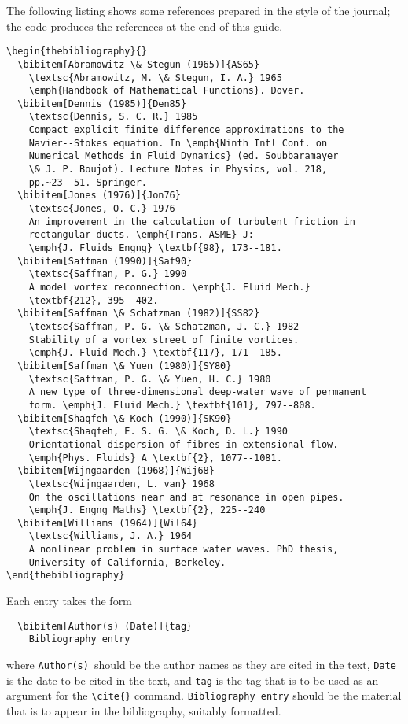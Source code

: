 \documentclass{jfm}
\begin{document}
The following listing shows some references prepared in the style of the
journal; the code produces the references at the end of this guide.
%
\begin{verbatim}
\begin{thebibliography}{}
  \bibitem[Abramowitz \& Stegun (1965)]{AS65}
    \textsc{Abramowitz, M. \& Stegun, I. A.} 1965
    \emph{Handbook of Mathematical Functions}. Dover.
  \bibitem[Dennis (1985)]{Den85}
    \textsc{Dennis, S. C. R.} 1985
    Compact explicit finite difference approximations to the
    Navier--Stokes equation. In \emph{Ninth Intl Conf. on
    Numerical Methods in Fluid Dynamics} (ed. Soubbaramayer
    \& J. P. Boujot). Lecture Notes in Physics, vol. 218,
    pp.~23--51. Springer.
  \bibitem[Jones (1976)]{Jon76}
    \textsc{Jones, O. C.} 1976
    An improvement in the calculation of turbulent friction in
    rectangular ducts. \emph{Trans. ASME} J:
    \emph{J. Fluids Engng} \textbf{98}, 173--181.
  \bibitem[Saffman (1990)]{Saf90}
    \textsc{Saffman, P. G.} 1990
    A model vortex reconnection. \emph{J. Fluid Mech.}
    \textbf{212}, 395--402.
  \bibitem[Saffman \& Schatzman (1982)]{SS82}
    \textsc{Saffman, P. G. \& Schatzman, J. C.} 1982
    Stability of a vortex street of finite vortices.
    \emph{J. Fluid Mech.} \textbf{117}, 171--185.
  \bibitem[Saffman \& Yuen (1980)]{SY80}
    \textsc{Saffman, P. G. \& Yuen, H. C.} 1980
    A new type of three-dimensional deep-water wave of permanent
    form. \emph{J. Fluid Mech.} \textbf{101}, 797--808.
  \bibitem[Shaqfeh \& Koch (1990)]{SK90}
    \textsc{Shaqfeh, E. S. G. \& Koch, D. L.} 1990
    Orientational dispersion of fibres in extensional flow.
    \emph{Phys. Fluids} A \textbf{2}, 1077--1081.
  \bibitem[Wijngaarden (1968)]{Wij68}
    \textsc{Wijngaarden, L. van} 1968
    On the oscillations near and at resonance in open pipes.
    \emph{J. Engng Maths} \textbf{2}, 225--240
  \bibitem[Williams (1964)]{Wil64}
    \textsc{Williams, J. A.} 1964
    A nonlinear problem in surface water waves. PhD thesis,
    University of California, Berkeley.
\end{thebibliography}
\end{verbatim}
%
Each entry takes the form
%
\begin{verbatim}
  \bibitem[Author(s) (Date)]{tag}
    Bibliography entry
\end{verbatim}
%
where \verb"Author(s)"\ should be the author names as they are cited in
the text, \verb"Date" is the date to be cited in the text, and \verb"tag"
is the tag that is to be used as an argument for the \verb"\cite{}" command.
\verb"Bibliography entry" should be the material that is to appear in the
bibliography, suitably formatted.
\end{document}
